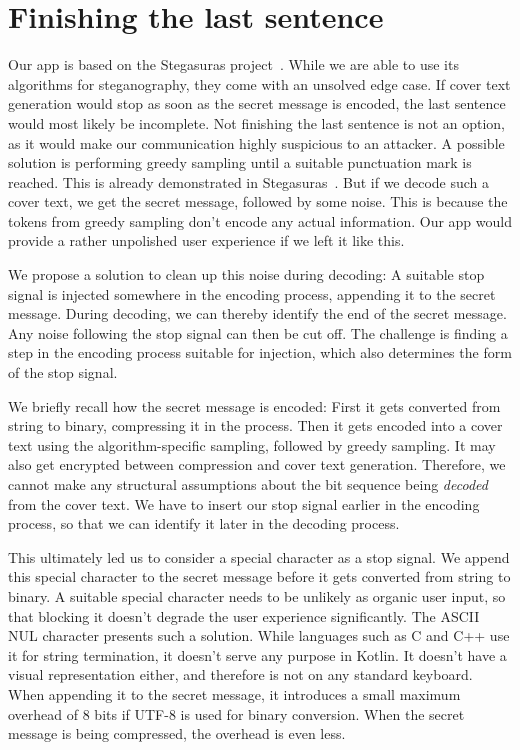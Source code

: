 \section{Finishing the last sentence}
\label{sec:finishingTheLastSentence}
Our app is based on the Stegasuras project~\cite{zieglerNeuralLinguisticSteganography2019}. While we are able to use its algorithms for steganography, they come with an unsolved edge case. If cover text generation would stop as soon as the secret message is encoded, the last sentence would most likely be incomplete. Not finishing the last sentence is not an option, as it would make our communication highly suspicious to an attacker. A possible solution is performing greedy sampling until a suitable punctuation mark is reached. This is already demonstrated in Stegasuras~\cite{zieglerHarvardnlpNeuralSteganography2025}. But if we decode such a cover text, we get the secret message, followed by some noise. This is because the tokens from greedy sampling don't encode any actual information. Our app would provide a rather unpolished user experience if we left it like this.

We propose a solution to clean up this noise during decoding: A suitable stop signal is injected somewhere in the encoding process, appending it to the secret message. During decoding, we can thereby identify the end of the secret message. Any noise following the stop signal can then be cut off. The challenge is finding a step in the encoding process suitable for injection, which also determines the form of the stop signal.

We briefly recall how the secret message is encoded: First it gets converted from string to binary, compressing it in the process. Then it gets encoded into a cover text using the algorithm-specific sampling, followed by greedy sampling. It may also get encrypted between compression and cover text generation. Therefore, we cannot make any structural assumptions about the bit sequence being \textit{decoded} from the cover text. We have to insert our stop signal earlier in the encoding process, so that we can identify it later in the decoding process.

This ultimately led us to consider a special character as a stop signal. We append this special character to the secret message before it gets converted from string to binary. A suitable special character needs to be unlikely as organic user input, so that blocking it doesn't degrade the user experience significantly. The ASCII NUL character presents such a solution. While languages such as C and C++ use it for string termination, it doesn't serve any purpose in Kotlin. It doesn't have a visual representation either, and therefore is not on any standard keyboard. When appending it to the secret message, it introduces a small maximum overhead of 8 bits if UTF-8 is used for binary conversion. When the secret message is being compressed, the overhead is even less.

